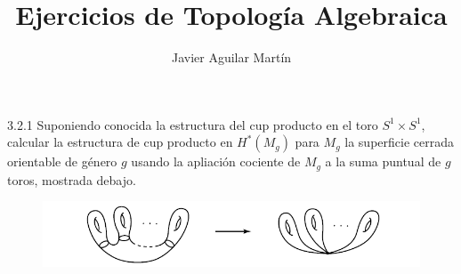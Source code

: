 \documentclass[twoside]{article}
\begin{document}
\title{Ejercicios de Topología Algebraica}
\author{Javier Aguilar Martín}
\maketitle

\begin{ejercicio}{3.2.1}
Suponiendo conocida la estructura del cup producto en el toro $S^1×S^1$, calcular la estructura de cup producto en $H^*(M_g)$ para $M_g$ la superficie cerrada orientable de género $g$ usando la apliación cociente de $M_g$ a la suma puntual de $g$ toros, mostrada debajo.


\begin{figure}[h!]
\includegraphics[scale=0.6]{mg}
\end{figure}
\end{ejercicio}
\end{document}
